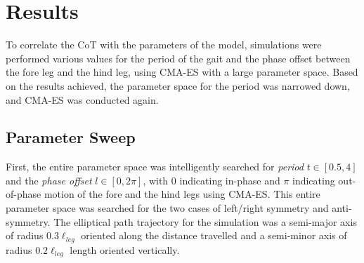 \documentclass[conference,11pt,letterpaper]{IEEEtran}
\begin{document}
\section{Results}

To correlate the CoT with the parameters of the model, simulations were performed various values for the period of the gait and the phase offset between the fore leg and the hind leg, using CMA-ES with a large parameter space. Based on the results achieved, the parameter space for the period was narrowed down, and CMA-ES was conducted again.

\subsection{Parameter Sweep}
First, the entire parameter space was intelligently searched for \emph{period} $t \in[0.5,4]$ and the \emph{phase offset} $l \in[0,2\pi]$, with $0$ indicating in-phase and $\pi$ indicating out-of-phase motion of the fore and the hind legs using CMA-ES. This entire parameter space was searched for the two cases of left/right symmetry and anti-symmetry. The elliptical path trajectory for the simulation was a semi-major axis of radius $0.3\ell_{leg}$ oriented along the distance travelled and a semi-minor axis of radius $0.2\ell_{leg}$ length oriented vertically. 
\end{document}
